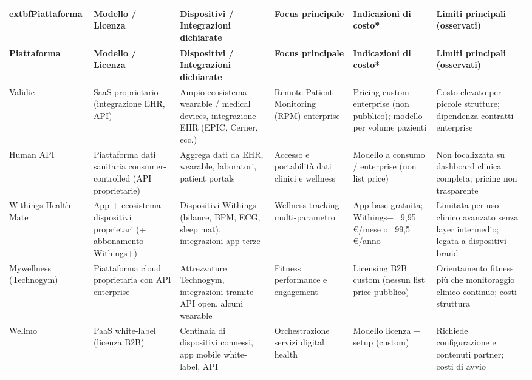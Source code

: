 \documentclass[12pt,a4paper,oneside]{report}
\begin{document}
\renewcommand{\arraystretch}{1.15}
\small
\begingroup
\setlength{\tabcolsep}{2pt}
\begin{longtable}{|>{\raggedright\arraybackslash}p{1.4cm}|>{\raggedright\arraybackslash}p{1.8cm}|>{\raggedright\arraybackslash}p{3.8cm}|>{\raggedright\arraybackslash}p{2.5cm}|>{\raggedright\arraybackslash}p{1.8cm}|>{\raggedright\arraybackslash}p{2cm}|}
\hline
\rowcolor[HTML]{F2F2F2}
	extbf{Piattaforma} & \textbf{Modello / Licenza} & \textbf{Dispositivi / Integrazioni dichiarate} & \textbf{Focus principale} & \textbf{Indicazioni di costo*} & \textbf{Limiti principali (osservati)} \\
\hline
\endfirsthead
\hline
\rowcolor[HTML]{F2F2F2}\textbf{Piattaforma} & \textbf{Modello / Licenza} & \textbf{Dispositivi / Integrazioni dichiarate} & \textbf{Focus principale} & \textbf{Indicazioni di costo*} & \textbf{Limiti principali (osservati)} \\
\hline
\endhead
Validic & SaaS proprietario (integrazione EHR, API) & Ampio ecosistema wearable / medical devices, integrazione EHR (EPIC, Cerner, ecc.) & Remote Patient Monitoring (RPM) enterprise & Pricing custom enterprise (non pubblico); modello per volume pazienti & Costo elevato per piccole strutture; dipendenza contratti enterprise \\
\hline
Human API & Piattaforma dati sanitaria consumer-controlled (API proprietarie) & Aggrega dati da EHR, wearable, laboratori, patient portals & Accesso e portabilità dati clinici e wellness & Modello a consumo / enterprise (non list price) & Non focalizzata su dashboard clinica completa; pricing non trasparente \\
\hline
Withings Health Mate & App + ecosistema dispositivi proprietari (+ abbonamento Withings+) & Dispositivi Withings (bilance, BPM, ECG, sleep mat), integrazioni app terze & Wellness tracking multi-parametro & App base gratuita; Withings+ ~9,95 €/mese o ~99,5 €/anno & Limitata per uso clinico avanzato senza layer intermedio; legata a dispositivi brand \\
\hline
Mywellness (Technogym) & Piattaforma cloud proprietaria con API enterprise & Attrezzature Technogym, integrazioni tramite API open, alcuni wearable & Fitness performance e engagement & Licensing B2B custom (nessun list price pubblico) & Orientamento fitness più che monitoraggio clinico continuo; costi struttura \\
\hline
Wellmo & PaaS white-label (licenza B2B) & Centinaia di dispositivi connessi, app mobile white-label, API & Orchestrazione servizi digital health & Modello licenza + setup (custom) & Richiede configurazione e contenuti partner; costi di avvio \\

\end{longtable}
\end{document}
